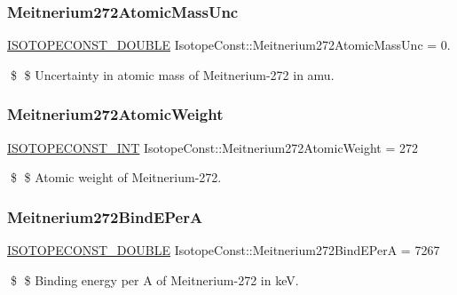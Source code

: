 \subsubsection{\texorpdfstring{Meitnerium272\+Atomic\+Mass\+Unc}{Meitnerium272AtomicMassUnc}}
{\footnotesize\ttfamily \mbox{\hyperlink{group___isotope_const-_macros_ga8f45a7272ce02c0b4c65c44636ed719a}{I\+S\+O\+T\+O\+P\+E\+C\+O\+N\+S\+T\+\_\+\+D\+O\+U\+B\+LE}} Isotope\+Const\+::\+Meitnerium272\+Atomic\+Mass\+Unc = 0.}

\$ \$ Uncertainty in atomic mass of Meitnerium-\/272 in amu. \mbox{\label{group___isotope_const-_meitnerium-_mt272_ga409c5eaf3c7f1c089e795c917a6c7011}} 
\subsubsection{\texorpdfstring{Meitnerium272\+Atomic\+Weight}{Meitnerium272AtomicWeight}}
{\footnotesize\ttfamily \mbox{\hyperlink{group___isotope_const-_macros_ga5f18360b3e99483a35c32d789e62621c}{I\+S\+O\+T\+O\+P\+E\+C\+O\+N\+S\+T\+\_\+\+I\+NT}} Isotope\+Const\+::\+Meitnerium272\+Atomic\+Weight = 272}

\$ \$ Atomic weight of Meitnerium-\/272. \mbox{\label{group___isotope_const-_meitnerium-_mt272_gacea4e3ebe5ccefb753ba3792d767c9f9}} 
\subsubsection{\texorpdfstring{Meitnerium272\+Bind\+E\+PerA}{Meitnerium272BindEPerA}}
{\footnotesize\ttfamily \mbox{\hyperlink{group___isotope_const-_macros_ga8f45a7272ce02c0b4c65c44636ed719a}{I\+S\+O\+T\+O\+P\+E\+C\+O\+N\+S\+T\+\_\+\+D\+O\+U\+B\+LE}} Isotope\+Const\+::\+Meitnerium272\+Bind\+E\+PerA = 7267}

\$ \$ Binding energy per A of Meitnerium-\/272 in keV. \mbox{\label{group___isotope_const-_meitnerium-_mt272_gaf2376eb94e643ffcca8942f5bbdf507d}} 
